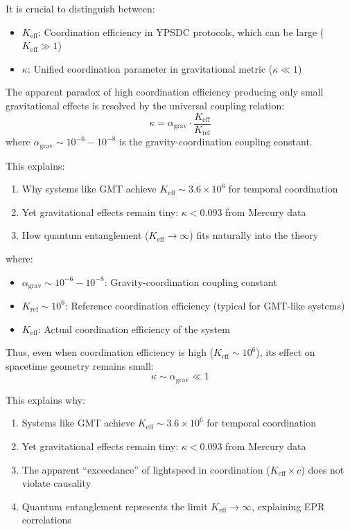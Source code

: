 \documentclass[11pt,a4paper]{article}
\begin{document}
It is crucial to distinguish between:
\begin{itemize}
	\item \textbf{$K_{\mathrm{eff}}$}: Coordination efficiency in YPSDC protocols, which can be large ($K_{\mathrm{eff}} \gg 1$)
	\item \textbf{$\kappa$}: Unified coordination parameter in gravitational metric ($\kappa \ll 1$)
\end{itemize}

The apparent paradox of high coordination efficiency producing only small gravitational effects is resolved by the universal coupling relation:
\begin{equation}
	\boxed{\kappa = \alpha_{\text{grav}} \cdot \frac{K_{\mathrm{eff}}}{K_{\text{ref}}}}
\end{equation}
where $\alpha_{\text{grav}} \sim 10^{-6} - 10^{-8}$ is the gravity-coordination coupling constant.

This explains:
\begin{enumerate}
	\item Why systems like GMT achieve $K_{\mathrm{eff}} \sim 3.6\times10^6$ for temporal coordination
	\item Yet gravitational effects remain tiny: $\kappa < 0.093$ from Mercury data
	\item How quantum entanglement ($K_{\mathrm{eff}} \to \infty$) fits naturally into the theory
\end{enumerate}
where:
\begin{itemize}
	\item $\alpha_{\text{grav}} \sim 10^{-6} - 10^{-8}$: Gravity-coordination coupling constant
	\item $K_{\text{ref}} \sim 10^6$: Reference coordination efficiency (typical for GMT-like systems)
	\item $K_{\mathrm{eff}}$: Actual coordination efficiency of the system
\end{itemize}

Thus, even when coordination efficiency is high ($K_{\mathrm{eff}} \sim 10^6$), its effect on spacetime geometry remains small:
\[
\kappa \sim \alpha_{\text{grav}} \ll 1
\]

This explains why:
\begin{enumerate}
	\item Systems like GMT achieve $K_{\mathrm{eff}} \sim 3.6\times10^6$ for temporal coordination
	\item Yet gravitational effects remain tiny: $\kappa < 0.093$ from Mercury data
	\item The apparent ``exceedance'' of lightspeed in coordination ($K_{\mathrm{eff}} \times c$) does not violate causality
	\item Quantum entanglement represents the limit $K_{\mathrm{eff}} \to \infty$, explaining EPR correlations
\end{enumerate}	
\end{document}
